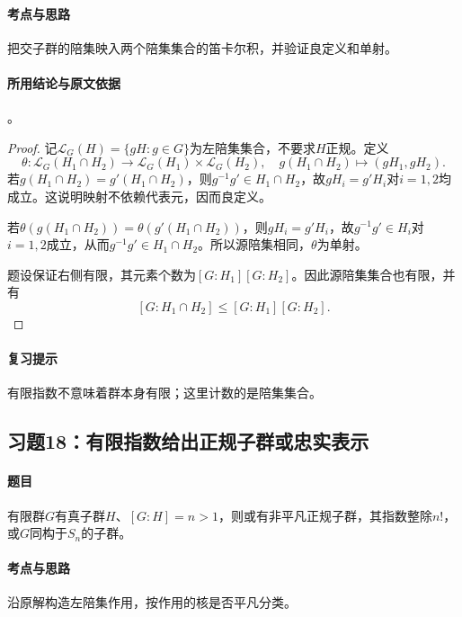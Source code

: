 \paragraph{考点与思路}
把交子群的陪集映入两个陪集集合的笛卡尔积，并验证良定义和单射。

\paragraph{所用结论与原文依据}
。


\begin{proof}
记$\mathcal L_G(H)=\{gH:g\in G\}$为左陪集集合，不要求$H$正规。定义
\[
\theta:\mathcal L_G(H_1\cap H_2)\longrightarrow
\mathcal L_G(H_1)\times\mathcal L_G(H_2),\quad
g(H_1\cap H_2)\longmapsto(gH_1,gH_2).
\]
若$g(H_1\cap H_2)=g'(H_1\cap H_2)$，则$g^{-1}g'\in H_1\cap H_2$，故$gH_i=g'H_i$对$i=1,2$均成立。这说明映射不依赖代表元，因而良定义。

若$\theta(g(H_1\cap H_2))=\theta(g'(H_1\cap H_2))$，则$gH_i=g'H_i$，故$g^{-1}g'\in H_i$对$i=1,2$成立，从而$g^{-1}g'\in H_1\cap H_2$。所以源陪集相同，$\theta$为单射。

题设保证右侧有限，其元素个数为$[G:H_1][G:H_2]$。因此源陪集集合也有限，并有
\[
[G:H_1\cap H_2]\leq[G:H_1][G:H_2].
\]
\end{proof}

\paragraph{复习提示}
有限指数不意味着群本身有限；这里计数的是陪集集合。


\subsection{习题18：\texorpdfstring{有限指数给出正规子群或忠实表示}{有限指数给出正规子群或忠实表示}}
\label{ex:2:18}

\paragraph{题目}
有限群$G$有真子群$H$、$[G:H]=n>1$，则或有非平凡正规子群，其指数整除$n!$，或$G$同构于$S_n$的子群。

\paragraph{考点与思路}
沿原解构造左陪集作用，按作用的核是否平凡分类。

